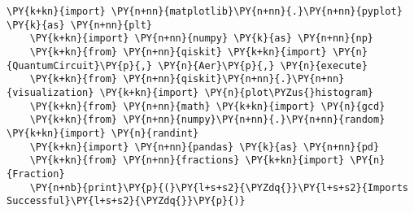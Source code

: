 \begin{tcolorbox}[breakable, size=fbox, boxrule=1pt, pad at break*=1mm,colback=cellbackground, colframe=cellborder]
    \begin{Verbatim}[commandchars=\\\{\}]
    \PY{k+kn}{import} \PY{n+nn}{matplotlib}\PY{n+nn}{.}\PY{n+nn}{pyplot} \PY{k}{as} \PY{n+nn}{plt}
    \PY{k+kn}{import} \PY{n+nn}{numpy} \PY{k}{as} \PY{n+nn}{np}
    \PY{k+kn}{from} \PY{n+nn}{qiskit} \PY{k+kn}{import} \PY{n}{QuantumCircuit}\PY{p}{,} \PY{n}{Aer}\PY{p}{,} \PY{n}{execute}
    \PY{k+kn}{from} \PY{n+nn}{qiskit}\PY{n+nn}{.}\PY{n+nn}{visualization} \PY{k+kn}{import} \PY{n}{plot\PYZus{}histogram}
    \PY{k+kn}{from} \PY{n+nn}{math} \PY{k+kn}{import} \PY{n}{gcd}
    \PY{k+kn}{from} \PY{n+nn}{numpy}\PY{n+nn}{.}\PY{n+nn}{random} \PY{k+kn}{import} \PY{n}{randint}
    \PY{k+kn}{import} \PY{n+nn}{pandas} \PY{k}{as} \PY{n+nn}{pd}
    \PY{k+kn}{from} \PY{n+nn}{fractions} \PY{k+kn}{import} \PY{n}{Fraction}
    \PY{n+nb}{print}\PY{p}{(}\PY{l+s+s2}{\PYZdq{}}\PY{l+s+s2}{Imports Successful}\PY{l+s+s2}{\PYZdq{}}\PY{p}{)}
    \end{Verbatim}
    \end{tcolorbox}